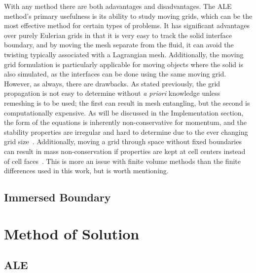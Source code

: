 \documentclass{article}
\begin{document}
With any method there are both adavantages and disadvantages.  The ALE method's primary usefulness is its ability to study moving grids, which can be the most effective method for certain types of problems.  It has significant advantages over purely Eulerian grids in that it is very easy to track the solid interface boundary, and by moving the mesh separate from the fluid, it can avoid the twisting typically associated with a Lagrangian mesh.  Additionally, the moving grid formulation is particularly applicable for moving objects where the solid is also simulated, as the interfaces can be done using the same moving grid.  However, as always, there are drawbacks.  As stated previously, the grid propagation is not easy to determine without \emph{a priori} knowledge unless remeshing is to be used; the first can result in mesh entangling, but the second is computationally expensive.   As will be discussed in the Implementation section, the form of the equations is inherently non-conservative for momentum, and the stability properties are irregular and hard to determine due to the ever changing grid size~\cite{hirt74}.  Additionally, moving a grid through space without fixed boundaries can result in mass non-conservation if properties are kept at cell centers instead of cell faces~\cite{ferziger12}.  This is more an issue with finite volume methods than the finite differences used in this work, but is worth mentioning.

\subsection{Immersed Boundary}



\section{Method of Solution}

\subsection{ALE}
\end{document}
